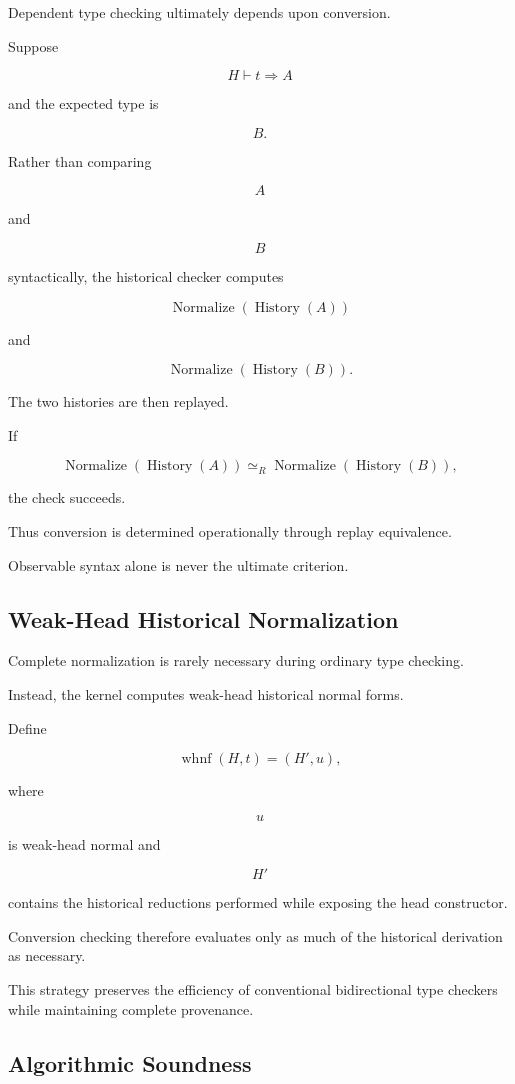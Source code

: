 \documentclass[12pt,oneside]{article}
\theoremstyle{definition}
\theoremstyle{remark}
\newcommand{\whnf}{\operatorname{whnf}}
\DeclareMathOperator{\History}{History}
\DeclareMathOperator{\Normalize}{Normalize}
\begin{document}
Dependent type checking ultimately depends upon conversion.

Suppose

\[
H
\vdash
t
\Rightarrow
A
\]

and the expected type is

\[
B.
\]

Rather than comparing

\[
A
\]

and

\[
B
\]

syntactically, the historical checker computes

\[
\Normalize(\History(A))
\]

and

\[
\Normalize(\History(B)).
\]

The two histories are then replayed.

If

\[
\Normalize(\History(A))
\simeq_R
\Normalize(\History(B)),
\]

the check succeeds.

Thus conversion is determined operationally through replay equivalence.

Observable syntax alone is never the ultimate criterion.

\subsection{Weak-Head Historical Normalization}

Complete normalization is rarely necessary during ordinary type checking.

Instead, the kernel computes weak-head historical normal forms.

Define

\[
\whnf(H,t)
=
(H',u),
\]

where

\[
u
\]

is weak-head normal and

\[
H'
\]

contains the historical reductions performed while exposing the head
constructor.

Conversion checking therefore evaluates only as much of the historical
derivation as necessary.

This strategy preserves the efficiency of conventional bidirectional type
checkers while maintaining complete provenance.

\subsection{Algorithmic Soundness}
\end{document}
